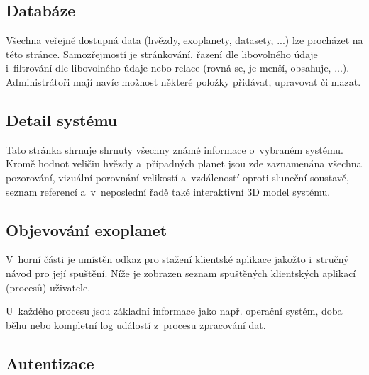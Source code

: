 \documentclass[a4paper,12pt]{article}
\begin{document}
{{{{{{{{{{{

\subsection{Databáze}

Všechna veřejně dostupná data (hvězdy, exoplanety, datasety, ...) lze procházet na této stránce. Samozřejmostí je stránkování, řazení dle libovolného údaje i~filtrování dle libovolného údaje nebo relace (rovná se, je menší, obsahuje, ...). Administrátoři mají navíc možnost některé položky přidávat, upravovat či mazat.


\subsection{Detail systému}

Tato stránka shrnuje shrnuty všechny známé informace o~vybraném systému. Kromě hodnot veličin hvězdy a~případných planet jsou zde zaznamenána všechna pozorování, vizuální porovnání velikostí a~vzdáleností oproti sluneční soustavě, seznam referencí a~v~neposlední řadě také interaktivní 3D model systému.


\subsection{Objevování exoplanet}

\vspace{-8pt}

V~horní části je umístěn odkaz pro stažení klientské aplikace jakožto i~stručný návod pro její spuštění. Níže je zobrazen seznam spuštěných klientských aplikací (procesů) uživatele.


 U~každého procesu jsou základní informace jako např. operační systém, doba běhu nebo kompletní log událostí z~procesu zpracování dat.


\vspace{-20pt}

\subsection{Autentizace}

}}}}}}}}}}}
\end{document}
